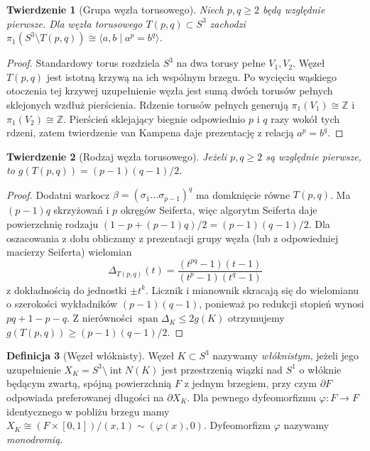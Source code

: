 \documentclass[11pt,a4paper]{report}
\numberwithin{equation}{section}
\theoremstyle{plain}
\newtheorem{twierdzenie}{Twierdzenie}[section]
\theoremstyle{definition}
\newtheorem{definicja}[twierdzenie]{Definicja}
\theoremstyle{remark}
\begin{document}
\begin{twierdzenie}[Grupa węzła torusowego]
Niech $p,q\geq2$ będą względnie pierwsze. Dla węzła torusowego
$T(p,q)\subset S^3$ zachodzi
$\pi_1(S^3\setminus T(p,q))\cong
\langle a,b\mid a^p=b^q\rangle$.
\end{twierdzenie}

\begin{proof}
Standardowy torus rozdziela $S^3$ na dwa torusy pełne
$V_1,V_2$. Węzeł $T(p,q)$ jest istotną krzywą na ich wspólnym
brzegu. Po wycięciu wąskiego otoczenia tej krzywej
uzupełnienie węzła jest sumą dwóch torusów pełnych sklejonych
wzdłuż pierścienia. Rdzenie torusów pełnych generują
$\pi_1(V_1)\cong\mathbb Z$ i $\pi_1(V_2)\cong\mathbb Z$.
Pierścień sklejający biegnie odpowiednio $p$ i $q$ razy
wokół tych rdzeni, zatem twierdzenie van Kampena daje
prezentację z relacją $a^p=b^q$.
\end{proof}

\begin{twierdzenie}[Rodzaj węzła torusowego]
Jeżeli $p,q\geq2$ są względnie pierwsze, to
$g(T(p,q))=(p-1)(q-1)/2$.
\end{twierdzenie}

\begin{proof}
Dodatni warkocz $\beta=(\sigma_1\dots\sigma_{p-1})^q$
ma domknięcie równe $T(p,q)$. Ma $(p-1)q$ skrzyżowań
i $p$ okręgów Seiferta, więc algorytm Seiferta daje
powierzchnię rodzaju $(1-p+(p-1)q)/2=(p-1)(q-1)/2$.
Dla oszacowania z dołu obliczamy z prezentacji grupy
węzła (lub z odpowiedniej macierzy Seiferta) wielomian
\[
\Delta_{T(p,q)}(t)=
\frac{(t^{pq}-1)(t-1)}{(t^p-1)(t^q-1)}
\]
z dokładnością do jednostki $\pm t^k$.
Licznik i mianownik skracają się do wielomianu o szerokości
wykładników $(p-1)(q-1)$, ponieważ po redukcji stopień
wynosi $pq+1-p-q$. Z nierówności
$\operatorname{span}\Delta_K\leq2g(K)$ otrzymujemy
$g(T(p,q))\geq(p-1)(q-1)/2$.
\end{proof}

\begin{definicja}[Węzeł włóknisty]
Węzeł $K\subset S^3$ nazywamy \emph{włóknistym}, jeżeli jego
uzupełnienie $X_K=S^3\setminus\operatorname{int}N(K)$
jest przestrzenią wiązki nad $S^1$ o włóknie będącym zwartą,
spójną powierzchnią $F$ z jednym brzegiem, przy czym
$\partial F$ odpowiada preferowanej długości na
$\partial X_K$. Dla pewnego dyfeomorfizmu
$\varphi\colon F\to F$ identycznego w pobliżu brzegu mamy
$X_K\cong (F\times[0,1])/(x,1)\sim(\varphi(x),0)$.
Dyfeomorfizm $\varphi$ nazywamy \emph{monodromią}.
\end{definicja}
\end{document}
